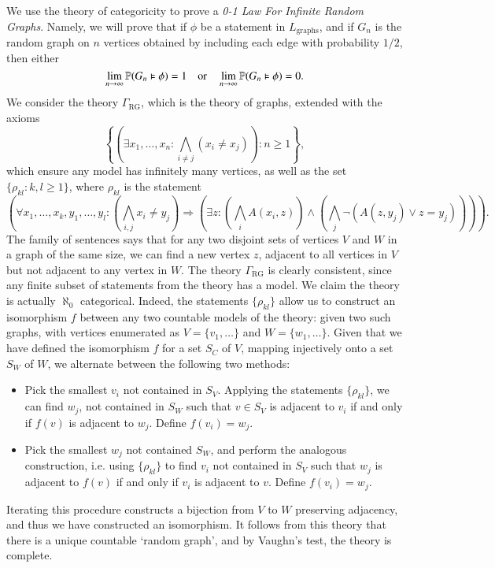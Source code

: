 \begin{example}
    We use the theory of categoricity to prove a \emph{0-1 Law For Infinite Random Graphs}. Namely, we will prove that if $\phi$ be a statement in $L_{\text{graphs}}$, and if $G_n$ is the random graph on $n$ vertices obtained by including each edge with probability $1/2$, then either
    \[ \lim_{n \to \infty} \operatorname{\mathbb{P}}(G_n \vDash \phi) = 1 \quad\text{or}\quad \lim_{n \to \infty} \operatorname{\mathbb{P}}(G_n \vDash \phi) = 0. \]
    We consider the theory $\Gamma_{\text{RG}}$, which is the theory of graphs, extended with the axioms
    \[ \left\{ \left( \exists x_1,\dots,x_n: \bigwedge_{i \neq j} (x_i \neq x_j) \right) : n \geq 1 \right\}, \]
    which ensure any model has infinitely many vertices, as well as the set $\{ \rho_{kl} : k,l \geq 1 \}$, where $\rho_{kl}$ is the statement
    \scriptsize \[ \left( \forall x_1,\dots,x_k,y_1,\dots,y_l: \left( \bigwedge_{i,j} x_i \neq y_j \right) \Rightarrow \left(\exists z: \left( \bigwedge_i A(x_i,z) \right) \wedge \left( \bigwedge_j \neg ( A(z,y_j) \vee z = y_j ) \right) \right) \right). \] \normalsize
    The family of sentences says that for any two disjoint sets of vertices $V$ and $W$ in a graph of the same size, we can find a new vertex $z$, adjacent to all vertices in $V$ but not adjacent to any vertex in $W$. The theory $\Gamma_{\text{RG}}$ is clearly consistent, since any finite subset of statements from the theory has a model. We claim the theory is actually $\aleph_0$ categorical. Indeed, the statements $\{ \rho_{kl} \}$ allow us to construct an isomorphism $f$ between any two countable models of the theory: given two such graphs, with vertices enumerated as $V = \{ v_1, \dots \}$ and $W = \{ w_1, \dots \}$. Given that we have defined the isomorphism $f$ for a set $S_C$ of $V$, mapping injectively onto a set $S_W$ of $W$, we alternate between the following two methods:
    \begin{itemize}
        \item Pick the smallest $v_i$ not contained in $S_V$. Applying the statements $\{ \rho_{kl} \}$, we can find $w_j$, not contained in $S_W$ such that $v \in S_V$ is adjacent to $v_i$ if and only if $f(v)$ is adjacent to $w_j$. Define $f(v_i) = w_j$.

        \item Pick the smallest $w_j$ not contained $S_W$, and perform the analogous construction, i.e. using $\{ \rho_{kl} \}$ to find $v_i$ not contained in $S_V$ such that $w_j$ is adjacent to $f(v)$ if and only if $v_i$ is adjacent to $v$. Define $f(v_i) = w_j$.
    \end{itemize}
    Iterating this procedure constructs a bijection from $V$ to $W$ preserving adjacency, and thus we have constructed an isomorphism. It follows from this theory that there is a unique countable `random graph', and by Vaughn's test, the theory is complete.


\end{example}
